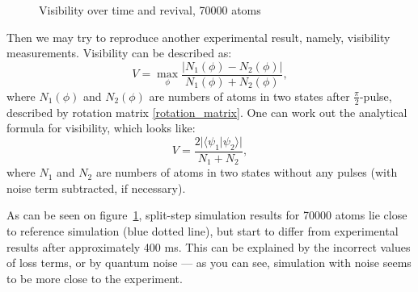 \documentclass[12pt,notitlepage]{report}
\begin{document}
\begin{figure}
\begin{center}
\qquad
{}
\end{center}
\caption{Visibility over time and revival, 70000 atoms}
\label{visibility_vs_reference}
\end{figure}

Then we may try to reproduce another experimental result, namely, visibility measurements.
Visibility can be described as:
\[ V = \max_{\phi} \frac{\vert N_1(\phi) - N_2(\phi) \vert}{N_1(\phi) + N_2(\phi)}, \]
where $N_1(\phi)$ and $N_2(\phi)$ are numbers of atoms in two states after $\frac{\pi}{2}$-pulse,
described by rotation matrix \ref{rotation_matrix}.
One can work out the analytical formula for visibility, which looks like:
\[ V = \frac{2 \vert \langle \psi_1 \vert \psi_2 \rangle \vert}{N_1 + N_2}, \]
where $N_1$ and $N_2$ are numbers of atoms in two states without any pulses (with noise term subtracted, if necessary).

As can be seen on figure~\ref{visibility_vs_reference},
split-step simulation results for 70000 atoms lie close to reference simulation (blue dotted line),
but start to differ from experimental results after approximately 400 ms.
This can be explained by the incorrect values of loss terms, or by quantum noise --- as you can see,
simulation with noise seems to be more close to the experiment.
\end{document}
